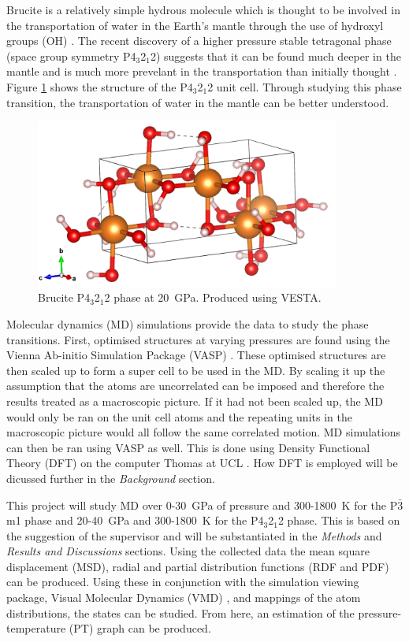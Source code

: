 \documentclass[a4paper,12pt]{article}
\begin{document}
Brucite is a relatively simple hydrous molecule which is thought to be involved in the transportation of water in the Earth's mantle through the use of hydroxyl groups (OH) \cite{BELL1391, peacockwater}. The recent discovery of a higher pressure stable tetragonal phase (space group symmetry P4$_3$2$_1$2) suggests that it can be found much deeper in the mantle and is much more prevelant in the transportation than initially thought \cite{HermannKey}. Figure \ref{Fig2} shows the structure of the P4$_3$2$_1$2 unit cell. Through studying this phase transition, the transportation of water in the mantle can be better understood.
\begin{figure}[h!!!!]
	\centering
	\includegraphics[width=10cm]{figures/p4_p0_gs.png}
	\caption{Brucite P4$_3$2$_1$2 phase at \SI{20}{\GPa}. Produced using VESTA.}
	\label{Fig2}
\end{figure}

Molecular dynamics (MD) simulations provide the data to study the phase transitions. First, optimised structures at varying pressures are found using the Vienna Ab-initio Simulation Package (VASP) \cite{VASP}. These optimised structures are then scaled up to form a super cell to be used in the MD. By scaling it up the assumption that the atoms are uncorrelated can be imposed and therefore the results treated as a macroscopic picture. If it had not been scaled up, the MD would only be ran on the unit cell atoms and the repeating units in the macroscopic picture would all follow the same correlated motion. MD simulations can then be ran using VASP as well. This is done using Density Functional Theory (DFT) on the computer Thomas at UCL \cite{THOMAS}. How DFT is employed will be dicussed further in the \textit{Background} section.

This project will study MD over 0-\SI{30}{\GPa} of pressure and 300-\SI{1800}{\K} for the P$\bar{3}$m1 phase and 20-\SI{40}{\GPa} and 300-\SI{1800}{\K} for the P4$_3$2$_1$2 phase. This is based on the suggestion of the supervisor and will be substantiated in the \textit{Methods} and \textit{Results and Discussions} sections. Using the collected data the mean square displacement (MSD), radial and partial distribution functions (RDF and PDF) can be produced. Using these in conjunction with the simulation viewing package, Visual Molecular Dynamics (VMD) \cite{VMD}, and mappings of the atom distributions, the states can be studied. From here, an estimation of the pressure-temperature (PT) graph can be produced.
\end{document}
